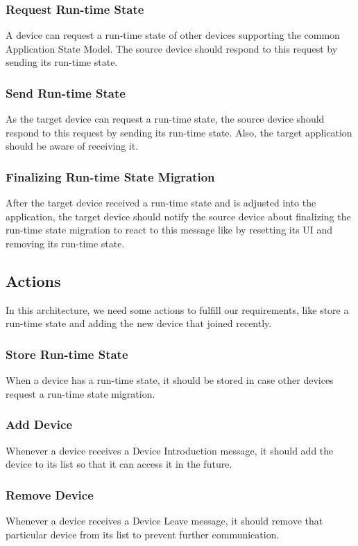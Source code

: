 \subsubsection{Request Run-time State}
A device can request a run-time state of other devices supporting the common Application State Model. The source device should respond to this request by sending its run-time state.

\subsubsection{Send Run-time State}
As the target device can request a run-time state, the source device should respond to this request by sending its run-time state. Also, the target application should be aware of receiving it.

\subsubsection{Finalizing Run-time State Migration}
After the target device received a run-time state and is adjusted into the application, the target device should notify the source device about finalizing the run-time state migration to react to this message like by resetting its UI and removing its run-time state.

\subsection{Actions}
In this architecture, we need some actions to fulfill our requirements, like store a run-time state and adding the new device that joined recently.

\subsubsection{Store Run-time State}
When a device has a run-time state, it should be stored in case other devices request a run-time state migration.

\subsubsection{Add Device}
Whenever a device receives a Device Introduction message, it should add the device to its list so that it can access it in the future.

\subsubsection{Remove Device}
Whenever a device receives a Device Leave message, it should remove that particular device from its list to prevent further communication.

